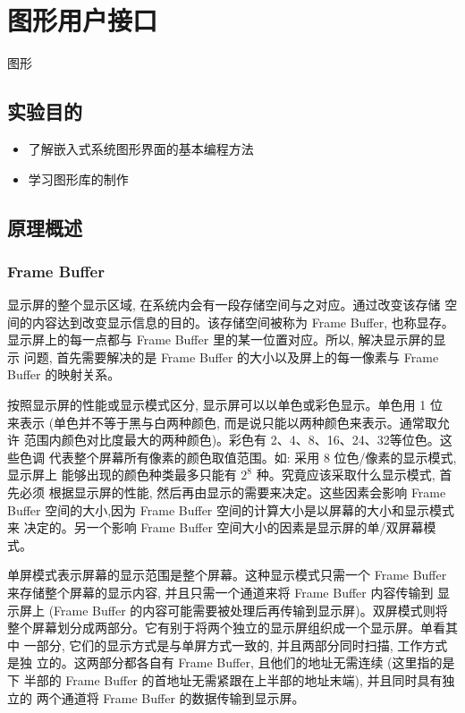 \chapter{图形用户接口}{图形}

\section{实验目的}
\begin{itemize}
    \item 了解嵌入式系统图形界面的基本编程方法
    \item 学习图形库的制作
\end{itemize}

\section{原理概述}
\subsection{Frame Buffer}
显示屏的整个显示区域, 在系统内会有一段存储空间与之对应。通过改变该存储
空间的内容达到改变显示信息的目的。该存储空间被称为 Frame Buffer, 也称显存。
显示屏上的每一点都与 Frame Buffer 里的某一位置对应。所以, 解决显示屏的显示
问题, 首先需要解决的是 Frame Buffer 的大小以及屏上的每一像素与 Frame
Buffer 的映射关系。

按照显示屏的性能或显示模式区分, 显示屏可以以单色或彩色显示。单色用 1 位
来表示 (单色并不等于黑与白两种颜色, 而是说只能以两种颜色来表示。通常取允许
范围内颜色对比度最大的两种颜色)。彩色有 2、4、8、16、24、32等位色。这些色调
代表整个屏幕所有像素的颜色取值范围。如: 采用 8 位色/像素的显示模式, 显示屏上
能够出现的颜色种类最多只能有 $2^8$ 种。究竟应该采取什么显示模式, 首先必须
根据显示屏的性能, 然后再由显示的需要来决定。这些因素会影响 Frame Buffer
空间的大小,因为 Frame Buffer 空间的计算大小是以屏幕的大小和显示模式来
决定的。另一个影响 Frame Buffer 空间大小的因素是显示屏的单/双屏幕模式。

单屏模式表示屏幕的显示范围是整个屏幕。这种显示模式只需一个 Frame Buffer
来存储整个屏幕的显示内容, 并且只需一个通道来将 Frame Buffer 内容传输到
显示屏上 (Frame Buffer 的内容可能需要被处理后再传输到显示屏)。双屏模式则将
整个屏幕划分成两部分。它有别于将两个独立的显示屏组织成一个显示屏。单看其中
一部分, 它们的显示方式是与单屏方式一致的, 并且两部分同时扫描, 工作方式是独
立的。这两部分都各自有 Frame Buffer, 且他们的地址无需连续 (这里指的是下
半部的 Frame Buffer 的首地址无需紧跟在上半部的地址末端), 并且同时具有独立的
两个通道将 Frame Buffer 的数据传输到显示屏。

